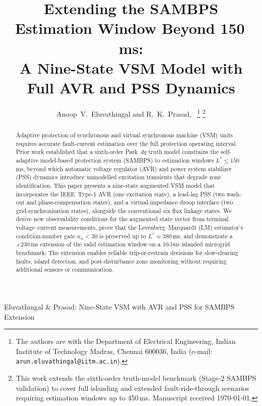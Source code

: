 \documentclass[journal]{IEEEtran}
\newcommand{\kappan}{\kappa_{n}}
\newcommand{\Lstar}{L^*}
\begin{document}
\title{Extending the SAMBPS Estimation Window Beyond 150\,ms:\\
       A Nine-State VSM Model with Full AVR and PSS Dynamics}

\author{Anoop~V.~Eluvathingal and R.~K.~Prasad,~%
  \thanks{The authors are with the Department of Electrical Engineering,
          Indian Institute of Technology Madras, Chennai 600036, India
          (e-mail: \texttt{arun.eluvathingal@iitm.ac.in}).}%
  \thanks{This work extends the sixth-order truth-model benchmark
          (Stage-2 SAMBPS validation) to cover full islanding and
          extended fault-ride-through scenarios requiring estimation
          windows up to 450\,ms.
          Manuscript received \today.}}

%
{Eluvathingal \& Prasad: Nine-State VSM with AVR and PSS for SAMBPS Extension}

\maketitle

\begin{abstract}
Adaptive protection of synchronous and virtual synchronous machine (VSM)
units requires accurate fault-current estimation over the full protection
operating interval.  Prior work established that a sixth-order Park~$dq$
truth model constrains the self-adaptive model-based protection system
(SAMBPS) to estimation windows $\Lstar \leq 150$\,ms, beyond which
automatic voltage regulator (AVR) and power system stabilizer (PSS)
dynamics introduce unmodelled excitation transients that degrade zone
identification.  This paper presents a nine-state augmented VSM model that
incorporates the IEEE~Type-1 AVR (one excitation state), a lead-lag PSS
(two wash-out and phase-compensation states), and a virtual-impedance
droop interface (two grid-synchronisation states), alongside the
conventional six flux linkage states.  We derive new observability
conditions for the augmented state vector from terminal
voltage--current measurements, prove that the Levenberg--Marquardt (LM)
estimator's condition-number gate $\kappan < 30$ is preserved up to
$\Lstar \approx 380$\,ms, and demonstrate a $+230$\,ms extension of the
valid estimation window on a 10-bus islanded microgrid benchmark.  The
extension enables reliable trip-or-restrain decisions for slow-clearing
faults, island detection, and post-disturbance zone monitoring without
requiring additional sensors or communication.
\end{abstract}
\end{document}
